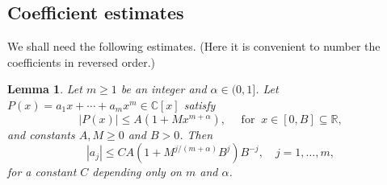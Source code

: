 \documentclass[12pt]{amsart}
\theoremstyle{plain}
\newtheorem{lemma}{Lemma}
\theoremstyle{definition}
\numberwithin{equation}{section}
\begin{document}
\subsection{Coefficient estimates}

We shall need the following estimates. (Here it is convenient to number the coefficients in reversed order.)

\begin{lemma} \label{lem:interpol}
  Let $m\ge 1$ be an integer and ${\alpha} \in (0,1]$.
  Let $P(x) = a_1 x + \cdots + a_{m} x^{m} \in {\mathbb{C}}[x]$ satisfy 
  \begin{equation} \label{interpol1}
    |P(x)| \le A (1+M x^{m+{\alpha}}), \quad \text{ for }~ x \in [0,B] \subseteq {\mathbb{R}},
  \end{equation}
  and constants $A, M \ge 0$ and $B>0$. Then 
  \begin{equation} \label{interpol2}
    |a_j| \le C A (1+M^{j/(m+{\alpha})} B^j) B^{-j}, \quad j=1,\ldots,m,
  \end{equation}
  for a constant $C$ depending only on $m$ and ${\alpha}$.
\end{lemma}
\end{document}

